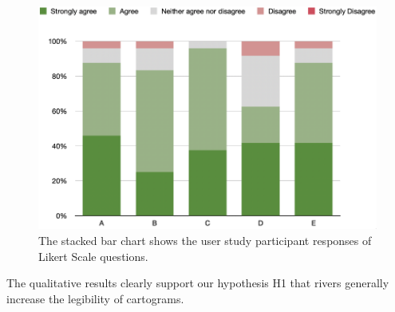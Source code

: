 {
\begin{figure}[tb!]
    \centering
    \includegraphics[width=\columnwidth,keepaspectratio]{figure/evaluation/likert.png}
    \caption{The stacked bar chart shows the user study participant responses of Likert Scale questions.}
    \label{fig:likert}
\end{figure}
}

The qualitative results clearly support our hypothesis H1 that rivers generally increase the legibility of cartograms.